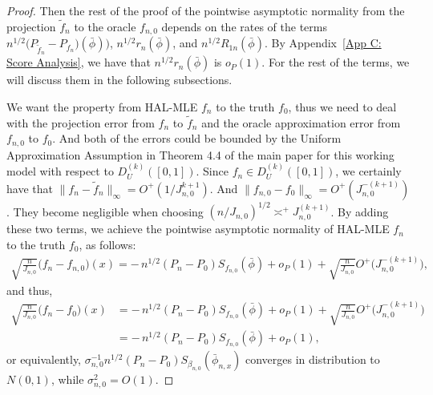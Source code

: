 \begin{proof}
Then the rest of the proof of the pointwise asymptotic normality from the projection $\tilde f_n$ to the oracle $f_{n,0}$ depends on the rates of the terms $n^{1/2}\bigl(P_{\tilde f_n} - P_{f_n})(\bar\phi)\bigr)$, $n^{1/2}r_n(\bar\phi)$, and $n^{1/2}R_{1n}(\bar\phi)$. By Appendix~\ref{App C: Score Analysis}, we have that $n^{1/2} r_n(\bar \phi)$ is $o_P(1)$. For the rest of the terms, we will discuss them in the following subsections.

We want the property from HAL-MLE $f_n$ to the truth $f_0$, thus we need to deal with the projection error from $f_n$ to $\tilde{f}_n$ and the oracle approximation error from $f_{n,0}$ to $f_0$. And both of the errors could be bounded by the Uniform Approximation Assumption in Theorem 4.4 of the main paper for this working model with respect to $D^{(k)}_U([0,1])$. Since $f_n\in D^{(k)}_U([0,1])$, we certainly have that $\| f_n-\tilde{f}_n\|_{\infty} = O^+(1/J_{n,0}^{k+1})$. And $\|f_{n,0} - f_0\|_{\infty} = O^+(J_{n,0}^{-(k+1)})$. They become negligible when choosing $(n/J_{n,0})^{1/2}\asymp^+ J_{n,0}^{(k+1)}$. By adding these two terms, we achieve the pointwise asymptotic normality of HAL-MLE $f_n$ to the truth $f_0$, as follows:
\begin{align*}
    \sqrt{\frac{n}{J_{n,0}}}\bigl(f_n - f_{n,0}\bigr)(x) = -\,n^{1/2}(P_n-P_0)S_{f_{n,0}}(\bar\phi)
     + o_P(1) + \sqrt{\frac{n}{J_{n,0}}}O^{+}\!\bigl(J_{n,0}^{-(k+1)}\bigr),
\end{align*}
and thus, 
\begin{align}
    \sqrt{\frac{n}{J_{n,0}}}\bigl(f_n - f_{0}\bigr)(x) &= -\,n^{1/2}(P_n-P_0)S_{f_{n,0}}(\bar\phi)
     + o_P(1) + \sqrt{\frac{n}{J_{n,0}}}O^{+}\!\bigl(J_{n,0}^{-(k+1)}\bigr) \nonumber \\
     &= -\,n^{1/2}(P_n-P_0)S_{f_{n,0}}(\bar\phi)
     + o_P(1),
\end{align}
or equivalently, $\sigma^{-1}_{n,0} n^{1/2}(P_n-P_0)S_{\beta_{n,0}}(\bar{\phi}_{n,x})$ converges in distribution to $N(0,1)$, while $\sigma^2_{n,0}=O(1)$.


\end{proof}
